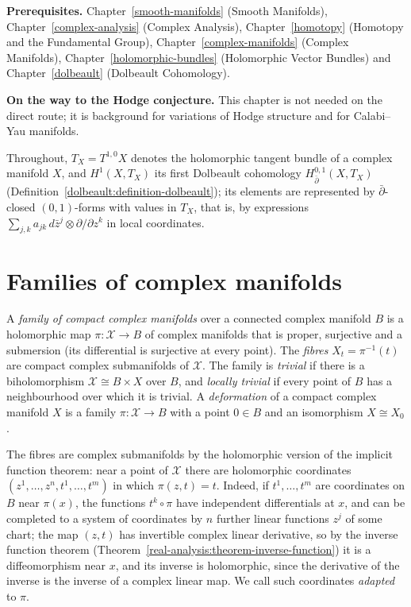 \noindent\textbf{Prerequisites.} Chapter~\ref{smooth-manifolds} (Smooth Manifolds), Chapter~\ref{complex-analysis} (Complex Analysis), Chapter~\ref{homotopy} (Homotopy and the Fundamental Group),
Chapter~\ref{complex-manifolds} (Complex Manifolds), Chapter~\ref{holomorphic-bundles} (Holomorphic Vector Bundles) and Chapter~\ref{dolbeault} (Dolbeault Cohomology).

\noindent\textbf{On the way to the Hodge conjecture.} This chapter is not needed on the direct route; it is background for variations of Hodge structure and for Calabi--Yau manifolds.

Throughout, $T_X = T^{1,0}X$ denotes the holomorphic tangent bundle of a complex manifold $X$, and $H^1(X, T_X)$ its first Dolbeault cohomology $H^{0,1}_{\bar\partial}(X, T_X)$
(Definition~\ref{dolbeault:definition-dolbeault}); its elements are represented by $\bar\partial$-closed $(0,1)$-forms with values in $T_X$, that is, by expressions
$\sum_{j,k}a_{jk}\,d\bar z^j \otimes \partial/\partial z^k$ in local coordinates.

\section{Families of complex manifolds}\label{deformations:section-families}

\begin{definition}\label{deformations:definition-family}
A \emph{family of compact complex manifolds} over a connected complex manifold $B$ is a holomorphic map $\pi \colon \mathcal{X} \to B$ of complex manifolds that is proper, surjective and a submersion
(its differential is surjective at every point). The \emph{fibres} $X_t = \pi^{-1}(t)$ are compact complex submanifolds of $\mathcal{X}$. The family is \emph{trivial} if there is a biholomorphism
$\mathcal{X} \cong B \times X$ over $B$, and \emph{locally trivial} if every point of $B$ has a neighbourhood over which it is trivial. A \emph{deformation} of a compact complex manifold $X$ is a family
$\pi \colon \mathcal{X} \to B$ with a point $0 \in B$ and an isomorphism $X \cong X_0$.
\end{definition}

The fibres are complex submanifolds by the holomorphic version of the implicit function theorem: near a point of $\mathcal{X}$ there are holomorphic coordinates $(z^1, \ldots, z^n, t^1, \ldots, t^m)$ in
which $\pi(z, t) = t$. Indeed, if $t^1, \ldots, t^m$ are coordinates on $B$ near $\pi(x)$, the functions $t^k \circ \pi$ have independent differentials at $x$, and can be completed to a system of
coordinates by $n$ further linear functions $z^j$ of some chart; the map $(z, t)$ has invertible complex linear derivative, so by the inverse function theorem
(Theorem~\ref{real-analysis:theorem-inverse-function}) it is a diffeomorphism near $x$, and its inverse is holomorphic, since the derivative of the inverse is the inverse of a complex linear map.
We call such coordinates \emph{adapted} to $\pi$.

